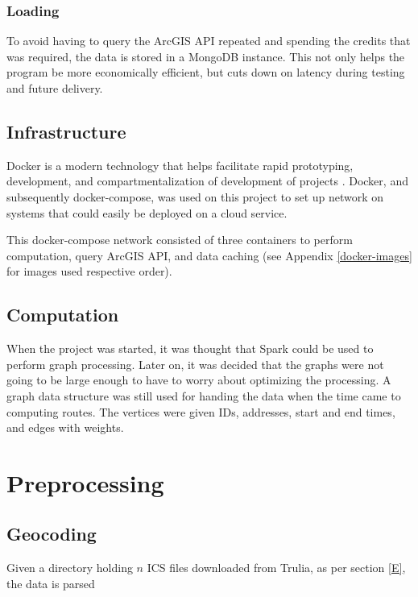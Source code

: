 \documentclass[11 pt]{article}
\theoremstyle{definition}
\theoremstyle{definition}
\begin{document}
\subsubsection{Loading}\label{L}
To avoid having to query the ArcGIS API repeated and spending the credits that was required\cite{ArcGIS}, the data is stored in a MongoDB instance. This not only helps the program be more economically efficient, but cuts down on latency during testing and future delivery.

\subsection{Infrastructure}
Docker is a modern technology that helps facilitate rapid prototyping, development, and compartmentalization of development of projects \cite{DOCKER}. Docker, and subsequently docker-compose\cite{DC}, was used on this project to set up network on systems that could easily be deployed on a cloud service. 

This docker-compose network consisted of three containers to perform computation, query ArcGIS API, and data caching (see Appendix \ref{docker-images} for images used respective order).

\subsection{Computation}

When the project was started, it was thought that Spark could be used to perform graph processing\cite{SPARK}. Later on, it was decided that the graphs were not going to be large enough to have to worry about optimizing the processing. A graph data structure was still used for handing the data when the time came to computing routes\cite{Agarwal}. The vertices were given IDs, addresses, start and end times, and edges with weights.

\section{Preprocessing}

\subsection{Geocoding} \label{geocoding}
Given a directory holding $n$ ICS files downloaded from Trulia, as per section \ref{E}, the data is parsed 

\end{document}
